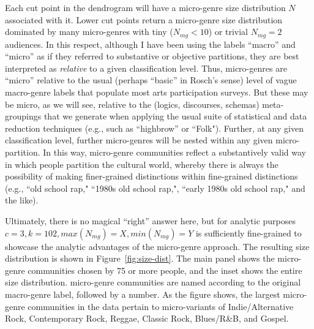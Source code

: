 \documentclass[a4paper,12pt]{extarticle}
\begin{document}
Each cut point in the dendrogram will have a micro-genre size distribution $N$ associated with it. Lower cut points return a micro-genre size distribution dominated by many micro-genres with tiny ($N_{mg} < 10$) or trivial $N_{mg} = 2$ audiences. In this respect, although I have been using the labels ``macro'' and ``micro'' as if they referred to substantive or objective partitions, they are best interpreted as {\em relative} to a given classification level. Thus, micro-genres are ``micro'' relative to the usual (perhaps ``basic'' in Rosch's \citeyearpar{Rosch1978-ue} sense) level of vague macro-genre labels that populate most arts participation surveys. But these may be micro, as we will see, relative to the (logics, discourses, schemas) meta-groupings that we generate when applying the usual suite of statistical and data reduction techniques (e.g., such as ``highbrow'' or ``Folk"). Further, at any given classification level, further micro-genres will be nested within any given micro-partition. In this way, micro-genre communities reflect a substantively valid way in which people partition the cultural world, whereby there is always the possibility of making finer-grained distinctions within fine-grained distinctions (e.g., ``old school rap," ``1980s old school rap,", ``early 1980s old school rap," and the like). 

Ultimately, there is no magical ``right'' answer here, but for analytic purposes $c = 3, k = 102, max(N_{mg}) = X, min(N_{mg}) = Y$ is sufficiently fine-grained to showcase the analytic advantages of the micro-genre approach. The resulting size distribution is shown in Figure~\ref{fig:size-dist}. The main panel shows the micro-genre communities chosen by 75 or more people, and the inset shows the entire size distribution. micro-genre communities are named according to the original macro-genre label, followed by a number. As the figure shows, the largest micro-genre communities in the data pertain to micro-variants of Indie/Alternative Rock, Contemporary Rock, Reggae, Classic Rock, Blues/R\&B, and Gospel. 
\end{document}
